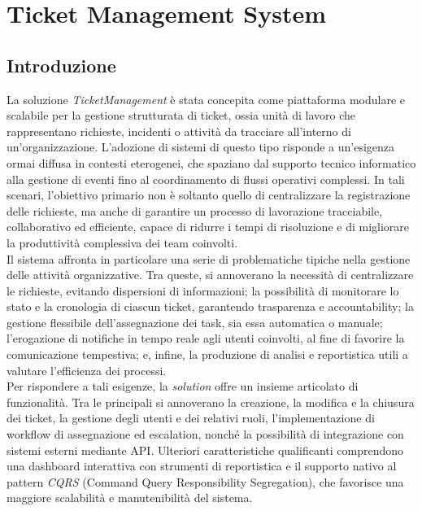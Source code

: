 \chapter{Ticket Management System}

\section{Introduzione}

La soluzione \textit{TicketManagement} è stata concepita come piattaforma modulare e scalabile per la gestione strutturata di ticket, ossia unità di lavoro che rappresentano richieste, incidenti o attività da tracciare all'interno di un'organizzazione. L'adozione di sistemi di questo tipo risponde a un'esigenza ormai diffusa in contesti eterogenei, che spaziano dal supporto tecnico informatico alla gestione di eventi fino al coordinamento di flussi operativi complessi. In tali scenari, l'obiettivo primario non è soltanto quello di centralizzare la registrazione delle richieste, ma anche di garantire un processo di lavorazione tracciabile, collaborativo ed efficiente, capace di ridurre i tempi di risoluzione e di migliorare la produttività complessiva dei team coinvolti.
\\
Il sistema affronta in particolare una serie di problematiche tipiche nella gestione delle attività organizzative. Tra queste, si annoverano la necessità di centralizzare le richieste, evitando dispersioni di informazioni; la possibilità di monitorare lo stato e la cronologia di ciascun ticket, garantendo trasparenza e accountability; la gestione flessibile dell'assegnazione dei task, sia essa automatica o manuale; l'erogazione di notifiche in tempo reale agli utenti coinvolti, al fine di favorire la comunicazione tempestiva; e, infine, la produzione di analisi e reportistica utili a valutare l'efficienza dei processi.
\\
Per rispondere a tali esigenze, la \textit{solution} offre un insieme articolato di funzionalità. Tra le principali si annoverano la creazione, la modifica e la chiusura dei ticket, la gestione degli utenti e dei relativi ruoli, l'implementazione di workflow di assegnazione ed escalation, nonché la possibilità di integrazione con sistemi esterni mediante API. Ulteriori caratteristiche qualificanti comprendono una dashboard interattiva con strumenti di reportistica e il supporto nativo al pattern \textit{CQRS} (Command Query Responsibility Segregation), che favorisce una maggiore scalabilità e manutenibilità del sistema.
\\
